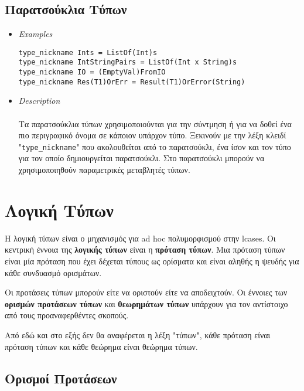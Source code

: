 \documentclass[diploma]{softlab-thesis}
\begin{document}
\subsection{Παρατσούκλια Τύπων}

\begin{itemize}

\item \textit{Examples}

\begin{verbatim}
type_nickname Ints = ListOf(Int)s
type_nickname IntStringPairs = ListOf(Int x String)s
type_nickname IO = (EmptyVal)FromIO
type_nickname Res(T1)OrErr = Result(T1)OrError(String)
\end{verbatim}

\item \textit{Description} \\\\
Τα παρατσούκλια τύπων χρησιμοποιούνται για την σύντμηση ή για να δοθεί
ένα πιο περιγραφικό όνομα σε κάποιον υπάρχον τύπο. Ξεκινούν με την λέξη
κλειδί "\verb|type_nickname|" που ακολουθείται από το παρατσούκλι, ένα ίσον
και τον τύπο για τον οποίο δημιουργείται παρατσούκλι. Στο παρατσούκλι μπορούν
να χρησιμοποιηθούν παραμετρικές μεταβλητές τύπων.

\end{itemize}

\newpage

\section{Λογική Τύπων}
\label{subsec:typelogicgr}

Η λογική τύπων είναι ο μηχανισμός για ad hoc πολυμορφισμού στην lcases.
Οι κεντρική έννοια της \textbf{λογικής τύπων} είναι η \textbf{πρόταση τύπων}.
Μια πρόταση τύπων είναι μία πρόταση που έχει δέχεται τύπους ως ορίσματα και
είναι αληθής η ψευδής για κάθε συνδυασμό ορισμάτων.

Οι προτάσεις τύπων μπορούν είτε να οριστούν είτε να αποδειχτούν.
Οι έννοιες των \textbf{ορισμών προτάσεων τύπων} και \textbf{θεωρημάτων τύπων}
υπάρχουν για τον αντίστοιχο από τους προαναφερθέντες σκοπούς.

Από εδώ και στο εξής δεν θα αναφέρεται η λέξη "τύπων", κάθε πρόταση είναι πρόταση
τύπων και κάθε θεώρημα είναι θεώρημα τύπων.

\subsection{Ορισμοί Προτάσεων}
\end{document}
